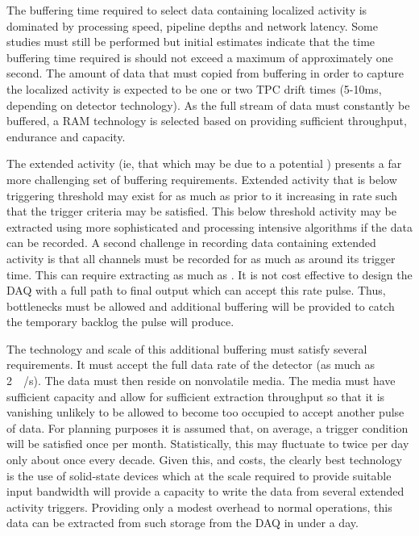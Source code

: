The buffering time required to select data containing localized activity is dominated by processing speed, pipeline depths and network latency. 
Some studies must still be performed but initial estimates indicate that the time buffering time required is should not exceed a maximum of approximately one second. 
The amount of data that must copied from buffering in order to capture the localized activity is expected to be one or two TPC drift times (5-10\si{\milli\second}, depending on detector technology).
As the full stream of data must constantly be buffered, a RAM technology is selected based on providing sufficient throughput, endurance and capacity.

The extended activity (ie, that which may be due to a potential ) presents a far more challenging set of buffering requirements.  
Extended activity that is below triggering threshold may exist for as much as \snbpretime prior to it increasing in rate such that the trigger criteria may be satisfied. 
This below threshold activity may be extracted using more sophisticated and processing intensive algorithms if the data can be recorded. 
A second challenge in recording data containing extended activity is that all channels must be recorded for as much as \snbtime around its trigger time.
This can require extracting as much as \spsnbsize.
It is not cost effective to design the DAQ with a full path to final output which can accept this rate pulse.
Thus, bottlenecks must be allowed and additional buffering will be provided to catch the temporary backlog the pulse will produce.

The technology and scale of this additional buffering must satisfy several requirements. 
It must accept the full data rate of the detector (as much as \SI{2}{\tera\byte/\second}). 
The data must then reside on nonvolatile media. 
The media must have sufficient capacity and allow for sufficient extraction throughput so that it is vanishing unlikely to be allowed to become too occupied to accept another pulse of data. 
For planning purposes it is assumed that, on average, a  trigger condition will be satisfied once per month. 
Statistically, this may fluctuate to twice per day only about once every decade.
Given this, and costs, the clearly best technology is the use of solid-state devices which at the scale required to provide suitable input bandwidth will provide a capacity to write the data from several extended activity triggers.
Providing only a modest overhead to normal operations, this data can be extracted from such storage from the DAQ in under a day.

